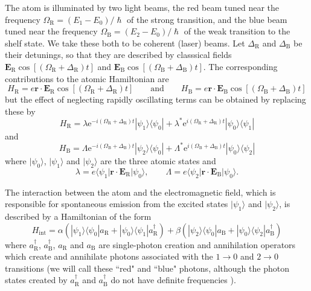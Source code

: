 \documentclass[12pt,a4paper,reqno]{article}
\renewcommand{\(}{\left(}
\renewcommand{\)}{\right)}
\newcommand{\e}{\mbox{e}}
\renewcommand{\hbar}{\hslash}
\newcommand{\tR}{\text{R}}
\newcommand{\tB}{\text{B}}
\newcommand{\br}{\mathbf{r}}
\newcommand{\bE}{\mathbf{E}}
\newcommand{\<}{\langle}
\renewcommand{\>}{\rangle}
\theoremstyle{plain} %
\theoremstyle{definition}
\theoremstyle{remark}
\begin{document}
The atom is illuminated by two light beams, the red
beam tuned near the frequency $\Omega_{\tR} = (E_1 - E_0)/\hbar$
of the strong transition, and the blue beam
tuned near the frequency $\Omega_{\tB} = (E_2 - E_0)/\hbar$ of the
weak transition to the shelf state. We take these both to be coherent
(laser) beams. Let $\Delta_{\tR}$ and $\Delta_{\tB}$ be their detunings, so
that they are described by classsical fields $\bE_{\tR}\cos[(\Omega_{\tR}
+ \Delta_{\tR})t]$ and $\bE_{\tB}\cos[(\Omega_{\tB} + \Delta_{\tB})t]$. The
corresponding contributions to the atomic Hamiltonian are
\[
H_{\tR} = e\br\cdot\bE_{\tR}\cos[(\Omega_{\tR} + \Delta_{\tR})t] \qquad \text{and}
\qquad H_{\tB} = e\br\cdot\bE_{\tB}\cos[(\Omega_{\tB} + \Delta_{\tB})t]
\]
but the effect of neglecting rapidly oscillating terms can be obtained
by replacing these by 
\begin{equation}
H_{\tR} = \lambda \e^{-i(\Omega_{\tR} + \Delta_{\tR})t}|\psi_1\>\<\psi_0| +
        \lambda^*\e^{i(\Omega_{\tR} + \Delta_{\tR})t}|\psi_0\>\<\psi_1|
\end{equation}
\noindent
and
\begin{equation}
H_{\tB} = \Lambda \e^{-i(\Omega_{\tB} + \Delta_{\tB})t}|\psi_2\>\<\psi_0| +
        \Lambda^*\e^{i(\Omega_{\tB} + \Delta_{\tB})t}|\psi_0\>\<\psi_2| 
\end{equation}
\noindent
where $|\psi_0\>$, $|\psi_1\>$ and $|\psi_2\>$ are the three atomic states and
\[
\lambda = e\<\psi_1|\br\cdot\bE_{\tR}|\psi_0\>, \qquad
\Lambda = e\<\psi_2|\br\cdot\bE_{\tB}|\psi_0\>.
\]

The interaction between the atom and the electromagnetic field, which is
responsible for spontaneous emission from the excited states $|\psi_1\>$ and
$|\psi_2\>$, is described by a Hamiltonian of the form \cite{rapid-dispersal}
\begin{equation}
H_{\text{int}} = \alpha\(|\psi_1\>\<\psi_0|a_{\tR} + |\psi_0\>\<\psi_1|a_{\tR}^\dagger\) + 
\beta\(|\psi_ 2\>\<\psi_0|a_{\tB} + |\psi_0\>\<\psi_2|a_{\tB}^\dagger\)
\end{equation}
where $a_{\tR}^\dagger$, $a_{\tB}^\dagger$, $a_{\tR}$ and $a_{\tB}$ are 
single-photon creation and annihilation operators which create and
annihilate photons associated with the $1\rightarrow 0$ and
$2\rightarrow 0$ transitions (we will call these ``red" and ``blue"
photons, although the photon states created by $a_{\tR}^\dagger$ and
$a_{\tB}^\dagger$ do not have definite frequencies \cite{rapid-dispersal}).
\end{document}
